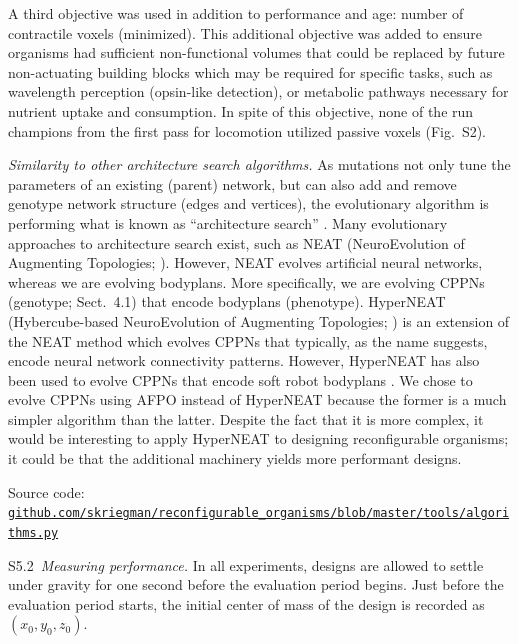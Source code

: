 A third objective was used in addition to performance and age: number of contractile voxels (minimized). 
This additional objective was added to ensure organisms had sufficient non-functional volumes that could be replaced by future non-actuating building blocks which may be required for specific tasks, such as wavelength perception (opsin-like detection), or metabolic pathways necessary for nutrient uptake and consumption. 
In spite of this objective, none of the run champions from the first pass for locomotion utilized passive voxels (Fig.~S2).

\textit{Similarity to other architecture search algorithms.}
As mutations not only tune the parameters of an existing (parent) network, but can also add and remove genotype network structure (edges and vertices), the evolutionary algorithm is performing what is known as ``architecture search'' \cite{elsken2018neural}. 
Many evolutionary approaches to architecture search exist, such as NEAT (NeuroEvolution of Augmenting Topologies; \cite{stanley2002evolving}).
However, NEAT evolves artificial neural networks, whereas we are evolving bodyplans. 
More specifically, we are evolving CPPNs (genotype; Sect.~4.1) that encode bodyplans (phenotype). 
HyperNEAT (Hybercube-based NeuroEvolution of Augmenting Topologies; \cite{stanley2009hypercube}) is an extension of the NEAT method which evolves CPPNs that typically, as the name suggests, encode neural network connectivity patterns. 
However, HyperNEAT has also been used to evolve CPPNs that encode soft robot bodyplans \cite{cheney2013unshackling}. 
We chose to evolve CPPNs using AFPO instead of HyperNEAT because the former is a much simpler algorithm than the latter. 
Despite the fact that it is more complex, it would be interesting to apply HyperNEAT to designing reconfigurable organisms; it could be that the additional machinery yields more performant designs. 

Source code: 
\href{https://github.com/skriegman/reconfigurable_organisms/blob/master/tools/algorithms.py}{\scriptsize\tt\color{blue}github.com/skriegman/reconfigurable\_organisms/blob/master/tools/algorithms.py}

\vspace{1em} 


S5.2~\textit{Measuring performance.}
In all experiments, designs are allowed to settle under gravity for one second before the evaluation period begins. Just before the evaluation period starts, the initial center of mass of the design is recorded as $(x_0, y_0, z_0)$. 

